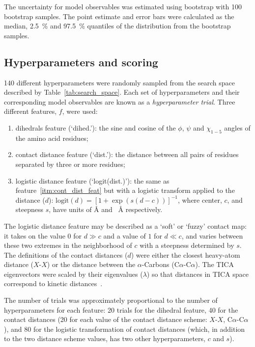 \documentclass[journal=jacsat,manuscript=article]{achemso}
\begin{document}
The uncertainty for model observables was estimated using bootstrap with \num{100} bootstrap samples. The point estimate and error bars were calculated as the median,   \SI{2.5}{\percent} and \SI{97.5}{\percent} quantiles of the distribution from the bootstrap samples.

\subsection{Hyperparameters and scoring}
\num{140} different hyperparameters were randomly sampled from the search space described by Table~\ref{tab:search_space}. Each set of hyperparameters and their corresponding model observables are known as a \emph{hyperparameter trial}. Three different features, $f$, were used: 
\begin{enumerate}
    \item dihedrals feature (`dihed.'): the sine and cosine of the $\phi$, $\psi$ and $\chi_{1-5}$ angles of the amino acid residues;
    \item contact distance feature (`dist.'): the distance between all pairs of residues separated by three or more residues; \label{itm:cont_dist_feat}
    \item logistic distance feature (`logit(dist.)'): the same as feature~\ref{itm:cont_dist_feat} but with a logistic transform applied to the distance ($d$): $\mathrm{logit}(d) = [1+\exp{(s(d-c))}]^{-1}$, where center, $c$, and steepness $s$,  have units of \si{\angstrom} and \si{\per\angstrom} respectively.
\end{enumerate}
The logistic distance feature may be described as a `soft' or `fuzzy' contact map: it takes on the value $0$ for $d \gg c$ and a value of $1$ for $d\ll c$, and varies between these two extremes in the neighborhood of $c$ with a steepness determined by $s$. The definitions of the contact distances ($d$) were either the closest heavy-atom distance ($X$-$X$) or the distance between the $\alpha$-Carbons (C$\alpha$-C$\alpha$). The TICA eigenvectors were scaled by their eigenvalues ($\lambda$) so that distances in TICA space correspond to kinetic distances~\cite{noeKineticDistanceKinetic2015}.

The number of trials was approximately proportional to the number of hyperparameters for each feature: 20 trials for the dihedral feature, 40 for the contact distances (20 for each value of the contact distance scheme: $X$-$X$,  C$\alpha$-C$\alpha$), and 80 for the logistic transformation of contact distances (which, in addition to the two distance scheme values, has two other hyperparameters, $c$ and $s$). 
\end{document}
